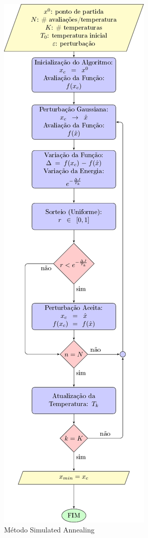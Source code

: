 \documentclass[conference,compsoc]{IEEEtran}
\begin{document}
\begin{figure}[!h]
\centering
\includegraphics[scale=0.72]{SA.pdf}
\caption{Método Simulated Annealing}
\label{fig:SA_flow}
\end{figure}
   
\end{document}

